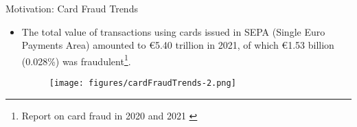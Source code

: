 
\begin{frame}{Motivation: Card Fraud Trends}
\begin{itemize}
    \item The total value of transactions using cards issued in SEPA (Single Euro Payments Area) amounted to €5.40 trillion in 2021, of which €1.53 billion (0.028\%) was fraudulent\footnote{ Report on card fraud in 2020 and 2021 \cite{ECB2023}}.
    \begin{figure}[H]
        \centering
        \hspace*{1.5cm}
        \texttt{[image: figures/cardFraudTrends-2.png]}
    \end{figure}
\end{itemize}
\end{frame}

